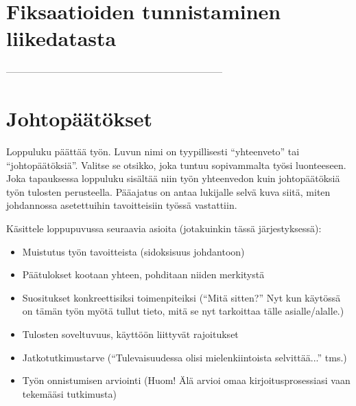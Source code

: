 \section{Fiksaatioiden tunnistaminen liikedatasta}

\label{sec:esimluku}

 --------------------------------------------------------------------

\section{Johtopäätökset}

Loppuluku päättää työn. Luvun nimi on tyypillisesti ``yhteenveto'' tai
``johtopäätöksiä''. Valitse se otsikko, joka tuntuu sopivammalta työsi
luonteeseen. Joka tapauksessa loppuluku sisältää niin työn yhteenvedon
kuin johtopäätöksiä työn tulosten perusteella. Pääajatus on antaa
lukijalle selvä kuva siitä, miten johdannossa asetettuihin
tavoitteisiin työssä vastattiin.

Käsittele loppupuvussa seuraavia asioita (jotakuinkin tässä järjestyksessä):
%
\begin{itemize}
  \item Muistutus työn tavoitteista (sidoksisuus johdantoon)
  \item Päätulokset kootaan yhteen, pohditaan niiden merkitystä
  \item Suositukset konkreettisiksi toimenpiteiksi (``Mitä sitten?'' 
Nyt kun käytössä on tämän työn myötä tullut tieto, 
mitä se nyt tarkoittaa tälle asialle/alalle.)
  \item Tulosten soveltuvuus, käyttöön liittyvät rajoitukset
  \item Jatkotutkimustarve 
(``Tulevaisuudessa olisi mielenkiintoista selvittää...'' tms.)
  \item Työn onnistumisen arviointi 
(Huom! Älä arvioi omaa kirjoitusprosessiasi vaan tekemääsi tutkimusta)
\end{itemize}


